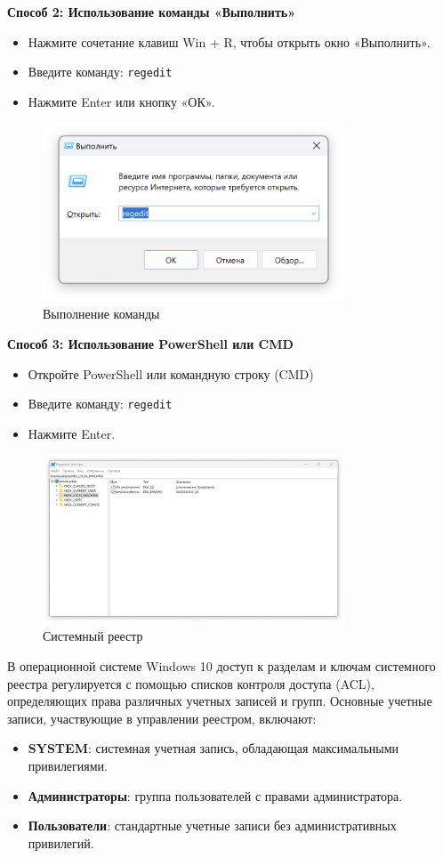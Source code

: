 \documentclass[a4paper, 14pt]{report}
\begin{document}
\textbf{Способ 2: Использование команды «Выполнить»}
\begin{itemize}
    \item Нажмите сочетание клавиш Win + R, чтобы открыть окно «Выполнить».
    \item {Введите команду: \verb|regedit|}
    \item Нажмите Enter или кнопку «ОК».
\end{itemize}
\begin{figure}[H]
    \centering
    \includegraphics[width=0.8\textwidth]{../images/exec-regedit.png}
    \caption{Выполнение команды}
\end{figure}


\textbf{Способ 3: Использование PowerShell или CMD}
\begin{itemize}
    \item Откройте PowerShell или командную строку (CMD)
    \item {Введите команду: \verb|regedit|}
    \item Нажмите Enter.
\end{itemize}
\begin{figure}[H]
    \centering
    \includegraphics[width=0.8\textwidth]{../images/regedit.png}
    \caption{Системный реестр}
\end{figure}
В операционной системе Windows 10 доступ к разделам и ключам системного реестра регулируется с помощью списков контроля доступа (ACL),
определяющих права различных учетных записей и групп.
Основные учетные записи, участвующие в управлении реестром, включают:
\begin{itemize}
    \item \textbf{SYSTEM}: системная учетная запись, обладающая максимальными привилегиями.
    \item \textbf{Администраторы}: группа пользователей с правами администратора.
    \item \textbf{Пользователи}: стандартные учетные записи без административных привилегий.
\end{itemize}
\end{document}
